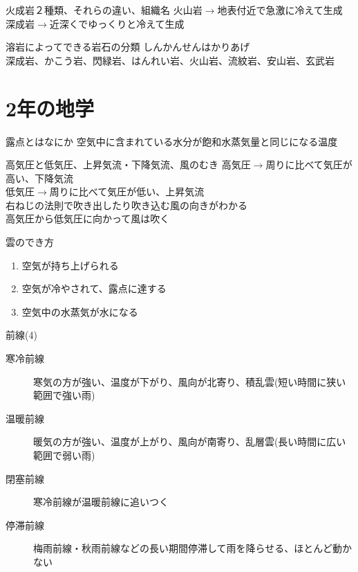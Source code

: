 \documentclass[10pt,dvipdfmx]{jsarticle}
\newcommand{\answer}[2]{{\color{orange}#2}}
\newcommand{\answer}[2]{\vspace{#1mm}}
\begin{document}
\begin{itembox}[l]{火成岩２種類、それらの違い、組織名}
	\answer{10}{
		火山岩$\rightarrow$地表付近で急激に冷えて生成\\
		深成岩$\rightarrow$近深くでゆっくりと冷えて生成
	}
\end{itembox}

\begin{itembox}[l]{溶岩によってできる岩石の分類}
	\answer{30}{
		しんかんせんはかりあげ\\
		深成岩、かこう岩、閃緑岩、はんれい岩、火山岩、流紋岩、安山岩、玄武岩
	}
\end{itembox}


\section{2年の地学}
\begin{itembox}[l]{露点とはなにか}
	\answer{10}{
		空気中に含まれている水分が飽和水蒸気量と同じになる温度
	}
\end{itembox}

\begin{itembox}[l]{高気圧と低気圧、上昇気流・下降気流、風のむき}
	\answer{10}{
		高気圧$\rightarrow$周りに比べて気圧が高い、下降気流\\
		低気圧$\rightarrow$周りに比べて気圧が低い、上昇気流\\
		右ねじの法則で吹き出したり吹き込む風の向きがわかる\\
		高気圧から低気圧に向かって風は吹く
	}
\end{itembox}

\begin{itembox}[l]{雲のでき方}
	\answer{10}{
		\begin{enumerate}
			\item 空気が持ち上げられる
			\item 空気が冷やされて、露点に達する
			\item 空気中の水蒸気が水になる
		\end{enumerate}
	}
\end{itembox}

\begin{itembox}[l]{前線(4)}
	\answer{10}{
		\begin{description}
			\item[寒冷前線] 寒気の方が強い、温度が下がり、風向が北寄り、積乱雲(短い時間に狭い範囲で強い雨)
			\item[温暖前線] 暖気の方が強い、温度が上がり、風向が南寄り、乱層雲(長い時間に広い範囲で弱い雨)
			\item[閉塞前線] 寒冷前線が温暖前線に追いつく
			\item[停滞前線] 梅雨前線・秋雨前線などの長い期間停滞して雨を降らせる、ほとんど動かない
		\end{description}
	}
\end{itembox}
\end{document}
